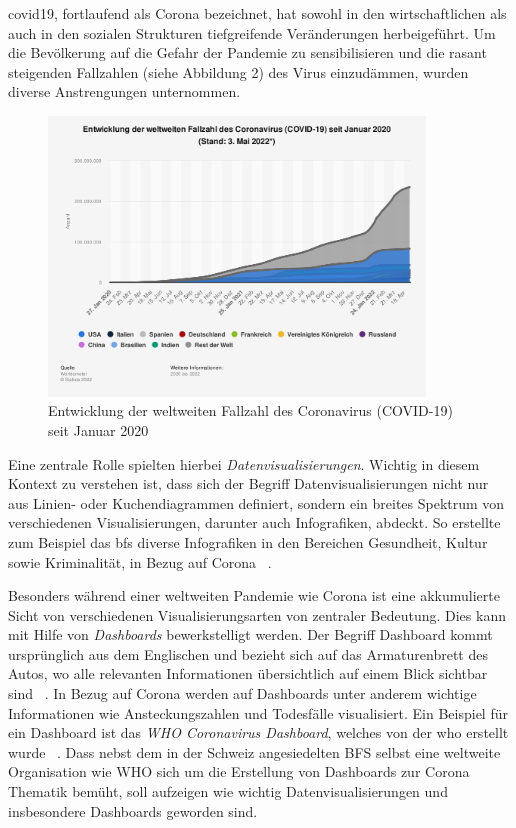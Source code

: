 \documentclass[12pt, oneside]{article}
\begin{document}
\Gls{covid19}, fortlaufend als Corona bezeichnet, hat sowohl in den wirtschaftlichen als auch in den sozialen Strukturen tiefgreifende Veränderungen herbeigeführt. Um die Bevölkerung auf die Gefahr der Pandemie zu sensibilisieren und die rasant steigenden Fallzahlen (siehe Abbildung 2) des Virus einzudämmen, wurden diverse Anstrengungen unternommen.

\begin{figure}[ht]
    \includegraphics[width=10cm]{images/corona_fallzahlen.png}
    \centering
    \caption{Entwicklung der weltweiten Fallzahl des Coronavirus (COVID-19) seit Januar 2020 ~\citep{covid_cases_worldwide}}
\end{figure}

Eine zentrale Rolle spielten hierbei \textit{Datenvisualisierungen}. Wichtig in diesem Kontext zu verstehen ist, dass sich der Begriff Datenvisualisierungen nicht nur aus Linien- oder Kuchendiagrammen definiert, sondern ein breites Spektrum von verschiedenen Visualisierungen, darunter auch Infografiken, abdeckt. So erstellte zum Beispiel das \Gls{bfs} diverse Infografiken in den Bereichen Gesundheit, Kultur sowie Kriminalität, in Bezug auf Corona ~\citep{covid19_bfs_infografiken}.

Besonders während einer weltweiten Pandemie wie Corona ist eine akkumulierte Sicht von verschiedenen Visualisierungsarten von zentraler Bedeutung. Dies kann mit Hilfe von \textit{Dashboards} bewerkstelligt werden. Der Begriff Dashboard kommt ursprünglich aus dem Englischen und bezieht sich auf das Armaturenbrett des Autos, wo alle relevanten Informationen übersichtlich auf einem Blick sichtbar sind ~\citep{Duden.18.04.2022}. In Bezug auf Corona werden auf Dashboards unter anderem wichtige Informationen wie Ansteckungszahlen und Todesfälle visualisiert. Ein Beispiel für ein Dashboard ist das \textit{WHO Coronavirus Dashboard}, welches von der \Gls{who} erstellt wurde ~\citep{who_dashboard}. Dass nebst dem in der Schweiz angesiedelten BFS selbst eine weltweite Organisation wie WHO sich um die Erstellung von Dashboards zur Corona Thematik bemüht, soll aufzeigen wie wichtig Datenvisualisierungen und insbesondere Dashboards geworden sind.
\end{document}
